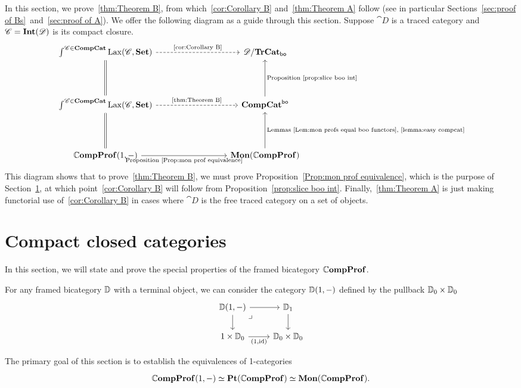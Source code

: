 \documentclass[12pt,oneside,article,draft]{memoir}
\begin{document}
In this section, we prove~\ref{thm:Theorem B}, from which~\ref{cor:Corollary B} and~\ref{thm:Theorem A} follow (see in particular Sections~\ref{sec:proof of Bs}~and~\ref{sec:proof of A}).
We offer the following diagram as a guide through this section.
Suppose $\cat{D}$ is a traced category and $\mathscr{C}=\mathbf{Int}(\mathscr{D})$ is its compact closure.
\[
\begin{tikzcd}[column sep=3cm,row sep=1.5cm]
   \int^{\cat{C}\in\CompCat}\Lax(\cat{C},\Set) \ar[r,dashed,"\tn{\ref{cor:Corollary B}}"]\ar[d,equal]
      & \cat{D}/\TrCat_{\bo} \\
   \int^{\cat{C}\in\CompCat}\Lax(\cat{C},\Set) \ar[r,dashed,"\tn{\ref{thm:Theorem B}}"]\ar[d,equal]
      & \CompCat^{\bo} \ar[u,"\tn{Proposition~\ref{prop:slice boo int}}"'] \\
   \dCompProf(1,-) \ar[r,"\tn{Proposition~\ref{Prop:mon prof equivalence}}"']
      & \Mon(\dCompProf) \ar[u,"\tn{Lemmas~\ref{Lem:mon profs equal boo functors},\ \ref{lemma:easy compcat}}"']
\end{tikzcd}
\]
This diagram shows that to prove~\ref{thm:Theorem B}, we must prove Proposition~\ref{Prop:mon prof equivalence}, which is the purpose of Section~\ref{sec:ccc's}, at which point~\ref{cor:Corollary B} will follow from Proposition~\ref{prop:slice boo int}.
Finally,~\ref{thm:Theorem A} is just making functorial use of~\ref{cor:Corollary B} in cases where $\cat{D}$ is the free traced category on a set of objects.


\section{Compact closed categories}\label{sec:ccc's}

In this section, we will state and prove the special properties of the framed bicategory $\mathbb{C}\mathbf{ompProf}$.

For any framed bicategory $\mathbb{D}$ with a terminal object, we can consider the category $\mathbb{D}(1,-)$ defined by the pullback $\mathbb{D}_0\times\mathbb{D}_0$
\begin{equation}
   \begin{tikzcd}
      \dcat{D}(1,-) \ar[r] \ar[d] \arrow[dr,phantom,"\lrcorner",very near start]
         & \dcat{D}_1 \ar[d] \\
      1\times\dcat{D}_0 \ar[r,"{(1,\id)}"']
         & \dcat{D}_0\times\dcat{D}_0
   \end{tikzcd}
\end{equation}

The primary goal of this section is to establish the equivalences of 1-categories
\begin{equation}
   \begin{tikzcd}
      \dCompProf(1,-) \equiv \Pt(\dCompProf) \equiv \Mon(\dCompProf).
   \end{tikzcd}
\end{equation}
\end{document}
